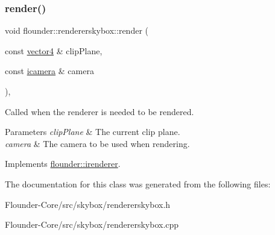 \subsubsection{\texorpdfstring{render()}{render()}}
{\footnotesize\ttfamily void flounder\+::rendererskybox\+::render (\begin{DoxyParamCaption}\item[{const \hyperlink{classflounder_1_1vector4}{vector4} \&}]{clip\+Plane,  }\item[{const \hyperlink{classflounder_1_1icamera}{icamera} \&}]{camera }\end{DoxyParamCaption})\hspace{0.3cm}{\ttfamily [override]}, {\ttfamily [virtual]}}



Called when the renderer is needed to be rendered. 


\begin{DoxyParams}{Parameters}
{\em clip\+Plane} & The current clip plane. \\
\hline
{\em camera} & The camera to be used when rendering. \\
\hline
\end{DoxyParams}


Implements \hyperlink{classflounder_1_1irenderer_a3f355dc39e2680bf3f3441d3dfaaa010}{flounder\+::irenderer}.



The documentation for this class was generated from the following files\+:\begin{DoxyCompactItemize}
\item 
Flounder-\/\+Core/src/skybox/rendererskybox.\+h\item 
Flounder-\/\+Core/src/skybox/rendererskybox.\+cpp\end{DoxyCompactItemize}
